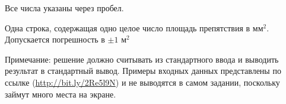 Все числа указаны через пробел.

\outputfmtSection

Одна строка, содержащая одно целое число площадь препятствия в мм$^2$. Допускается погрешность в $ \pm 1$ м$^2  $

Примечание: решение должно считывать из стандартного ввода и выводить результат в стандартный вывод. 
Примеры входных данных представлены по ссылке (\url{http://bit.ly/2Re5l9N}) и не выводятся в самом задании, поскольку займут много места на экране.

